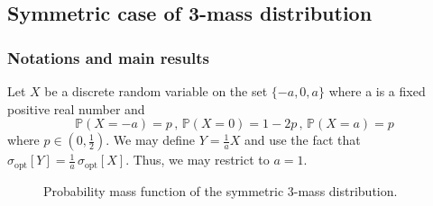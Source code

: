 \documentclass[a4paper, 10pt]{article}
\renewcommand{\P}{\mathbb{P}}
\theoremstyle{definition}
\begin{document}
\subsection{Symmetric case of 3-mass distribution}\label{subsec;symmthreepoints}
\subsubsection{Notations and main results}
Let $X$ be a discrete random variable on the set $\{-a,0,a\}$ where a is a fixed positive real number and
\begin{equation}
    \P(X=-a)=p\,,\, \P(X=0)=1-2p\,,\, \P(X=a)=p
\end{equation}
where $p\in \left( 0,\frac{1}{2}\right)$.
We may define $Y=\frac{1}{a}X$ and use the fact that $\sigma_{\mathrm{opt}}[Y]=\frac{1}{a}\, \sigma_{\mathrm{opt}}[X]$. Thus, we may restrict to $a=1$.\\
\begin{figure}[h!]
    \centering
    \caption{Probability mass function of the symmetric 3-mass distribution.}
    \label{fig:three_mass_distribution}
\end{figure}
\end{document}
